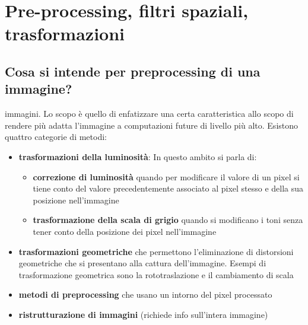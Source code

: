 \chapter{Pre-processing, filtri spaziali, trasformazioni}

\section{Cosa si intende per preprocessing di una immagine?}
immagini. Lo scopo è quello di enfatizzare una certa caratteristica allo scopo di rendere più adatta l'immagine a computazioni future di livello più alto. Esistono quattro categorie di metodi:
\begin{itemize}
	\item \textbf{trasformazioni della luminosità}: In questo ambito si parla di:
		\begin{itemize}
			\item \textbf{correzione di luminosità} quando per modificare il valore di un pixel si tiene conto del valore precedentemente 	associato al pixel stesso e della sua posizione nell'immagine
			
			\item \textbf{trasformazione della scala di grigio} quando si modificano i toni senza tener conto della posizione dei pixel nell'immagine
		\end{itemize}
	
	\item \textbf{trasformazioni geometriche} che permettono l'eliminazione di distorsioni geometriche che si presentano alla cattura dell'immagine. Esempi di trasformazione geometrica sono la rototraslazione e il cambiamento di scala
	
	\item \textbf{metodi di preprocessing} che usano un intorno del pixel processato
	
	\item \textbf{ristrutturazione di immagini} (richiede info sull'intera immagine)
\end{itemize}

